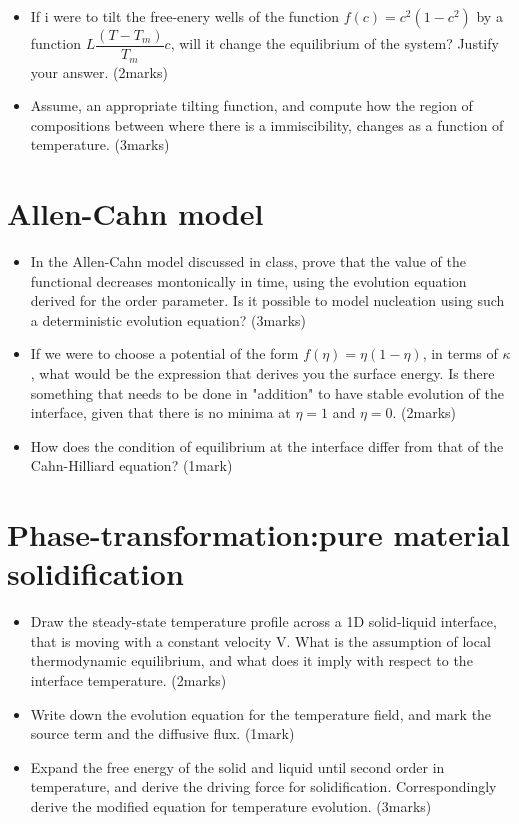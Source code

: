 \documentclass[a4paper,10pt]{article}
\begin{document}
\begin{itemize}
 \item If i were to tilt the free-enery wells of the function $f\left(c\right)=c^{2}\left(1-c^{2}\right)$ by a function
 $L\dfrac{\left(T-T_m\right)}{T_m}c$, will it change the equilibrium of the system? Justify your answer. (2marks)
 \item Assume, an appropriate tilting function, and compute how the region of compositions between where there
 is a immiscibility, changes as a function of temperature. (3marks)
\end{itemize}

\section{Allen-Cahn model}
\begin{itemize}
 \item In the Allen-Cahn model discussed in class, prove that the value of the functional decreases montonically in time, using
 the evolution equation derived for the order parameter. Is it possible to model nucleation using such a deterministic evolution equation? (3marks)
 \item If we were to choose a potential of the form $f\left(\eta\right)=\eta\left(1-\eta\right)$, in terms of $\kappa$, what would
 be the expression that derives you the surface energy. Is there something that needs to be done in "addition" to have stable evolution of
 the interface, given that there is no minima at $\eta=1$ and $\eta=0$. (2marks)
 \item How does the condition of equilibrium at the interface differ from that of the Cahn-Hilliard equation? (1mark)
\end{itemize}

\section{Phase-transformation:pure material solidification}

\begin{itemize}
 \item Draw the steady-state temperature profile across a 1D solid-liquid interface, that is moving with a constant velocity V. 
 What is the assumption of local thermodynamic equilibrium, 
 and what does it imply with respect to the interface temperature. (2marks)
 \item Write down the evolution equation for the temperature field, and mark the source term and the diffusive flux. (1mark)
 \item Expand the free energy of the solid and liquid until second order in temperature, and derive the driving force for
 solidification. Correspondingly derive the modified equation for temperature evolution. (3marks)
\end{itemize}
\end{document}
